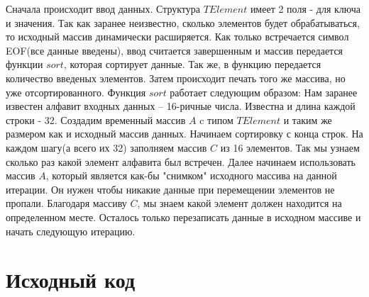 	Сначала происходит ввод данных. Структура $TElement$ имеет 2 поля - для ключа и значения. Так как заранее неизвестно, сколько элементов будет обрабатываться, то исходный массив динамически расширяется. Как только встречается символ EOF(все данные введены), ввод считается завершенным и массив передается функции $sort$, которая сортирует данные. Так же, в функцию передается количество введеных элементов. Затем происходит печать того же массива, но уже отсортированного.
Функция $sort$ работает следующим образом: Нам заранее известен алфавит входных данных -- 16-ричные числа. Известна и длина каждой строки - 32. Создадим временный массив $A$ c типом $TElement$ и таким же размером как и исходный массив данных. Начинаем сортировку с конца строк. На каждом шагу(а всего их 32) заполняем массив $C$ из 16 элементов. Так мы узнаем сколько раз какой элемент алфавита был встречен.
	Далее начинаем использовать массив $A$, который является как-бы "снимком" исходного массива на данной итерации. Он нужен чтобы никакие данные при перемещении элементов не пропали. Благодаря массиву $C$, мы знаем какой элемент должен находится на определенном месте. Осталось только перезаписать данные в исходном массиве и начать следующую итерацию.
\pagebreak

\section{Исходный код}

